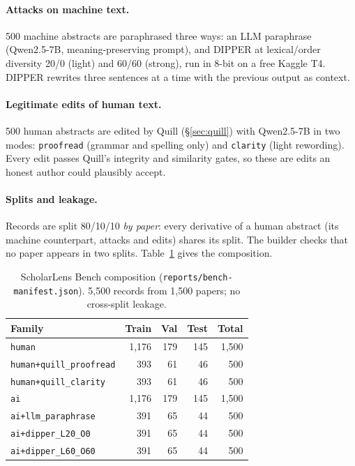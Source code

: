 \documentclass[11pt]{article}
\newcommand{\fy}[1]{\texttt{#1}}
\begin{document}
\paragraph{Attacks on machine text.}
500 machine abstracts are paraphrased three ways: an LLM paraphrase (Qwen2.5-7B, meaning-preserving prompt), and DIPPER \citep{krishna2023paraphrasing} at lexical/order diversity 20/0 (light) and 60/60 (strong), run in 8-bit \citep{dettmers2022int8} on a free Kaggle T4.
DIPPER rewrites three sentences at a time with the previous output as context.

\paragraph{Legitimate edits of human text.}
500 human abstracts are edited by Quill (\S\ref{sec:quill}) with Qwen2.5-7B in two modes: \fy{proofread} (grammar and spelling only) and \fy{clarity} (light rewording).
Every edit passes Quill's integrity and similarity gates, so these are edits an honest author could plausibly accept.

\paragraph{Splits and leakage.}
Records are split 80/10/10 \emph{by paper}: every derivative of a human abstract (its machine counterpart, attacks and edits) shares its split.
The builder checks that no paper appears in two splits.
Table~\ref{tab:bench} gives the composition.

\begin{table}[t]
\centering
\caption{ScholarLens Bench composition (\texttt{reports/bench-manifest.json}). 5{,}500 records from 1{,}500 papers; no cross-split leakage.}
\label{tab:bench}
\begin{tabular}{lrrrr}
\toprule
Family & Train & Val & Test & Total \\
\midrule
\fy{human} & 1{,}176 & 179 & 145 & 1{,}500 \\
\fy{human+quill\_proofread} & 393 & 61 & 46 & 500 \\
\fy{human+quill\_clarity} & 393 & 61 & 46 & 500 \\
\fy{ai} & 1{,}176 & 179 & 145 & 1{,}500 \\
\fy{ai+llm\_paraphrase} & 391 & 65 & 44 & 500 \\
\fy{ai+dipper\_L20\_O0} & 391 & 65 & 44 & 500 \\
\fy{ai+dipper\_L60\_O60} & 391 & 65 & 44 & 500 \\
\bottomrule
\end{tabular}
\end{table}
\end{document}
